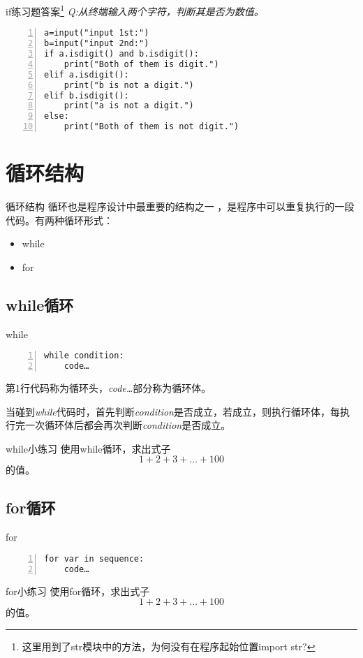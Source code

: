 \documentclass{beamer}
\begin{document}
\begin{frame}[fragile]{if练习题答案\footnote{这里用到了str模块中的方法，为何没有在程序起始位置import str?}}
\textit{Q:从终端输入两个字符，判断其是否为数值。}
\begin{Verbatim}[numbers=left,frame=single,rulecolor=\color{red}]
a=input("input 1st:")
b=input("input 2nd:")
if a.isdigit() and b.isdigit():
    print("Both of them is digit.")
elif a.isdigit():
    print("b is not a digit.")
elif b.isdigit():
    print("a is not a digit.")
else:
    print("Both of them is not digit.")
\end{Verbatim}

\end{frame}

\section{循环结构}
\begin{frame}[fragile]{循环结构}
循环也是程序设计中最重要的结构之一
，是程序中可以重复执行的一段代码。有两种循环形式：
\begin{itemize}
\item while
\item for
\end{itemize}


\end{frame}
\subsection{while循环}

\begin{frame}[fragile]{while}
\begin{Verbatim}[numbers=left,frame=single,rulecolor=\color{red}]
while condition:
    code…
\end{Verbatim}
第1行代码称为循环头，\textit{code…}部分称为循环体。

当碰到\textit{while}代码时，首先判断\textit{condition}是否成立，若成立，则执行循环体，每执行完一次循环体后都会再次判断\textit{condition}是否成立。
\end{frame}
\begin{frame}[fragile]{while小练习}
使用while循环，求出式子\begin{equation*}
1+2+3+…+100
\end{equation*}的值。
\end{frame}
\subsection{for循环}
\begin{frame}[fragile]{for}
\begin{Verbatim}[numbers=left,frame=single,rulecolor=\color{red}]
for var in sequence:
    code…
\end{Verbatim}
\end{frame}
\begin{frame}[fragile]{for小练习}
使用for循环，求出式子\begin{equation*}
1+2+3+…+100
\end{equation*}的值。
\end{frame}
\end{document}
